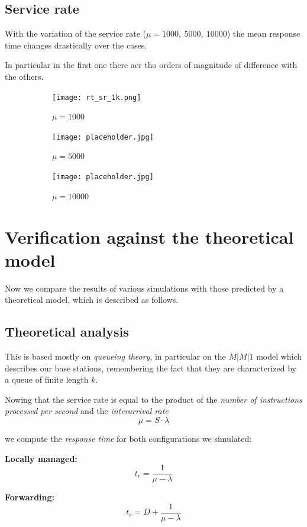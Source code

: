 \documentclass{report}
\begin{document}
\subsection{Service rate}
With the variation of the service rate ($\mu = 1000, \ 5000, \ 10000$) the mean response time changes drastically over the cases.

In particular in the first one there aer tho orders of magnitude of difference with the others.

\begin{figure}[H]
    \begin{subfigure}{0.55\textwidth}
        \centering
        \texttt{[image: rt\_sr\_1k.png]}
        \caption{$\mu = 1000$}
    \end{subfigure}
    \begin{subfigure}{0.55\textwidth}
        \centering
        \texttt{[image: placeholder.jpg]}
        \caption{$\mu = 5000$}
    \end{subfigure}
    \begin{subfigure}{0.55\textwidth}
        \centering
        \texttt{[image: placeholder.jpg]}
        \caption{$\mu = 10000$}
    \end{subfigure}
    \caption{}
\end{figure}

\section{Verification against the theoretical model}
Now we compare the results of various simulations with those predicted by a theoretical model, which is described as follows.

\subsection{Theoretical analysis}
This is based mostly on \textit{queueing theory}, in particular on the $M|M|1$ model which describes our base stations, remembering the fact that they are characterized by a queue of finite length $k$.

Nowing that the service rate is equal to the product of the \textit{number of instructions processed per second} and the \textit{interarrival rate}
\[\mu = S\cdot \lambda\]

we compute the \textit{response time} for both configurations we simulated:

\textbf{Locally managed:}
\[t_r=\frac{1}{\mu-\lambda}\]

\textbf{Forwarding:}
\[t_r=D+\frac{1}{\mu-\lambda}\]
\end{document}
